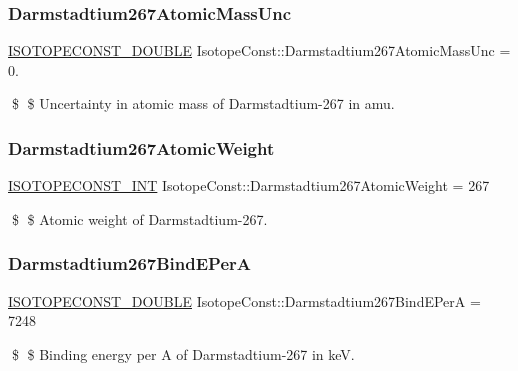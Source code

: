 \subsubsection{\texorpdfstring{Darmstadtium267\+Atomic\+Mass\+Unc}{Darmstadtium267AtomicMassUnc}}
{\footnotesize\ttfamily \mbox{\hyperlink{group___isotope_const-_macros_ga8f45a7272ce02c0b4c65c44636ed719a}{I\+S\+O\+T\+O\+P\+E\+C\+O\+N\+S\+T\+\_\+\+D\+O\+U\+B\+LE}} Isotope\+Const\+::\+Darmstadtium267\+Atomic\+Mass\+Unc = 0.}

\$ \$ Uncertainty in atomic mass of Darmstadtium-\/267 in amu. \mbox{\label{group___isotope_const-_darmstadtium-_ds267_ga821b6c66d2d95f5a16cd84d59077cc7f}} 
\subsubsection{\texorpdfstring{Darmstadtium267\+Atomic\+Weight}{Darmstadtium267AtomicWeight}}
{\footnotesize\ttfamily \mbox{\hyperlink{group___isotope_const-_macros_ga5f18360b3e99483a35c32d789e62621c}{I\+S\+O\+T\+O\+P\+E\+C\+O\+N\+S\+T\+\_\+\+I\+NT}} Isotope\+Const\+::\+Darmstadtium267\+Atomic\+Weight = 267}

\$ \$ Atomic weight of Darmstadtium-\/267. \mbox{\label{group___isotope_const-_darmstadtium-_ds267_gaa74c9f705b35210ea026401bad329aa5}} 
\subsubsection{\texorpdfstring{Darmstadtium267\+Bind\+E\+PerA}{Darmstadtium267BindEPerA}}
{\footnotesize\ttfamily \mbox{\hyperlink{group___isotope_const-_macros_ga8f45a7272ce02c0b4c65c44636ed719a}{I\+S\+O\+T\+O\+P\+E\+C\+O\+N\+S\+T\+\_\+\+D\+O\+U\+B\+LE}} Isotope\+Const\+::\+Darmstadtium267\+Bind\+E\+PerA = 7248}

\$ \$ Binding energy per A of Darmstadtium-\/267 in keV. \mbox{\label{group___isotope_const-_darmstadtium-_ds267_gafa57d7fa5b00e821982c16ef7a55ee99}} 
